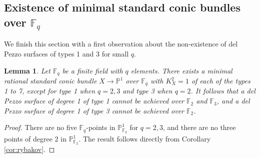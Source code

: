 \documentclass[a4paper, 11pt, reqno]{amsart}
\numberwithin{equation}{section} \numberwithin{figure}{section}
\def \F {{\mathbb F}}
\def \P {{\mathbb P}}
\newcommand{\ra}{\rightarrow}
\newtheorem{lemma}{Lemma}
\theoremstyle{definition}
\numberwithin{lemma}{section}
\begin{document}

\subsection{Existence of minimal standard conic bundles over $\F_q$}\label{sec:nonexistence}

We finish this section with a first observation about the non-existence of del Pezzo surfaces of types 1 and 3 for small $q$.

\begin{lemma}\label{lem:smallfields}
    Let $\F_q$ be a finite field with $q$ elements. There exists a minimal rational standard conic bundle $X \ra \P^1$ over $\F_q$ with $K_X^2 = 1$ of each of the types 1 to 7, except for type 1 when $q = 2, 3$ and type 3 when $q = 2$. It follows that a del Pezzo surface of degree 1 of type 1 cannot be achieved over $\F_2$ and $\F_3$, and a del Pezzo surface of degree 1 of type 3 cannot be achieved over $\F_2$. 
\end{lemma}

\begin{proof}
    There are no five $\F_q$-points in $\P^1_{\F_q}$ for $q = 2, 3$, and there are no three points of degree 2 in $\P^1_{\F_2}$. The result follows directly from Corollary \ref{cor:rybakov}.
\end{proof}
\end{document}
